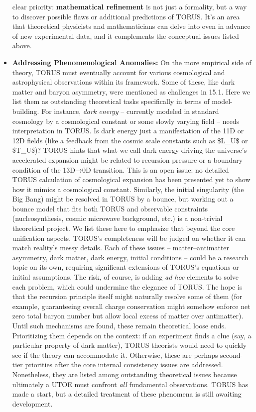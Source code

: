 \documentclass[]{article}
\begin{document}
\begin{itemize}
  clear priority: \textbf{mathematical refinement} is not just a
  formality, but a way to discover possible flaws or additional
  predictions of TORUS. It's an area that theoretical physicists and
  mathematicians can delve into even in advance of new experimental
  data, and it complements the conceptual issues listed above.
\item
  \textbf{Addressing Phenomenological Anomalies:} On the more empirical
  side of theory, TORUS must eventually account for various cosmological
  and astrophysical observations within its framework. Some of these,
  like dark matter and baryon asymmetry, were mentioned as challenges in
  15.1. Here we list them as outstanding theoretical tasks specifically
  in terms of model-building. For instance, \emph{dark energy} --
  currently modeled in standard cosmology by a cosmological constant or
  some slowly varying field -- needs interpretation in TORUS. Is dark
  energy just a manifestation of the 11D or 12D fields (like a feedback
  from the cosmic scale constants such as \$L\_U\$ or \$T\_U\$)? TORUS
  hints that what we call dark energy driving the universe's accelerated
  expansion might be related to recursion pressure or a boundary
  condition of the 13D→0D transition. This is an open issue: no detailed
  TORUS calculation of cosmological expansion has been presented yet to
  show how it mimics a cosmological constant. Similarly, the initial
  singularity (the Big Bang) might be resolved in TORUS by a bounce, but
  working out a bounce model that fits both TORUS and observable
  constraints (nucleosynthesis, cosmic microwave background, etc.) is a
  non-trivial theoretical project. We list these here to emphasize that
  beyond the core unification aspects, TORUS's completeness will be
  judged on whether it can match reality's messy details. Each of these
  issues -- matter--antimatter asymmetry, dark matter, dark energy,
  initial conditions -- could be a research topic on its own, requiring
  significant extensions of TORUS's equations or initial assumptions.
  The risk, of course, is adding \emph{ad hoc} elements to solve each
  problem, which could undermine the elegance of TORUS. The hope is that
  the recursion principle itself might naturally resolve some of them
  (for example, guaranteeing overall charge conservation might somehow
  enforce net zero total baryon number but allow local excess of matter
  over antimatter). Until such mechanisms are found, these remain
  theoretical loose ends. Prioritizing them depends on the context: if
  an experiment finds a clue (say, a particular property of dark
  matter), TORUS theorists would need to quickly see if the theory can
  accommodate it. Otherwise, these are perhaps second-tier priorities
  after the core internal consistency issues are addressed. Nonetheless,
  they are listed among outstanding theoretical issues because
  ultimately a UTOE must confront \emph{all} fundamental observations.
  TORUS has made a start, but a detailed treatment of these phenomena is
  still awaiting development.
\end{itemize}
\end{document}
